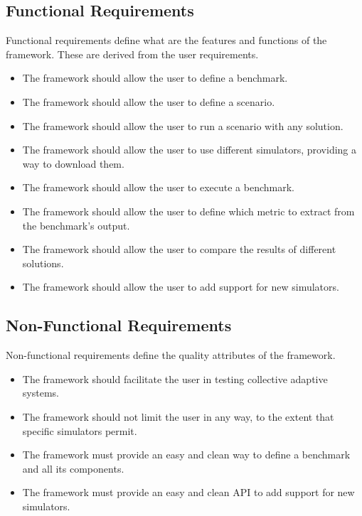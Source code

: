 \documentclass[12pt,a4paper,openright,twoside]{book}
\begin{document}
\subsection*{Functional Requirements}
Functional requirements define what are the features and functions of the framework.
These are derived from the user requirements.

\begin{itemize}
  \item The framework should allow the user to define a benchmark.
  \item The framework should allow the user to define a scenario.
  \item The framework should allow the user to run a scenario with any solution.
  \item The framework should allow the user to use different simulators, providing a way to download them.
  \item The framework should allow the user to execute a benchmark.
  \item The framework should allow the user to define which metric to extract from the benchmark's output.
  \item The framework should allow the user to compare the results of different solutions.
  \item The framework should allow the user to add support for new simulators.
\end{itemize}

\subsection*{Non-Functional Requirements}
Non-functional requirements define the quality attributes of the framework.

\begin{itemize}
  \item The framework should facilitate the user in testing collective adaptive systems.
  \item The framework should not limit the user in any way, to the extent that specific simulators permit.
  \item The framework must provide an easy and clean way to define a benchmark and all its components.
  \item The framework must provide an easy and clean API to add support for new simulators.
\end{itemize}

\end{document}
